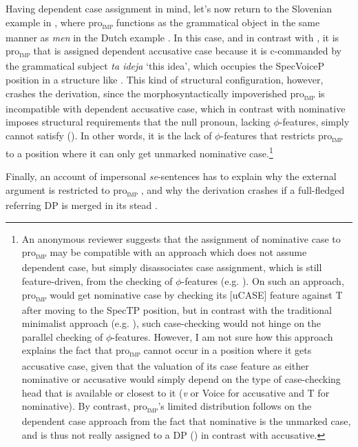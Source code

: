 \documentclass[output=paper,
modfonts,nonflat,
newtxmath
]{langsci/langscibook}
\begin{document}
 Having dependent case assignment in mind, let's now return to the Slovenian example in , where pro\textsubscript{\textsc{imp}} functions as the grammatical object in the same manner as \textit{men} in the Dutch example . In this case, and in contrast with , it is pro\textsubscript{\textsc{imp}} that is assigned dependent accusative case because it is c-commanded by the grammatical subject \textit{ta ideja} `this idea', which occupies the SpecVoiceP position in a structure like . This kind of structural configuration, however, crashes the derivation, since the morphosyntactically impoverished pro\textsubscript{\textsc{imp}} is incompatible with dependent accusative case, which in contrast with nominative imposes structural requirements that the null pronoun, lacking $\phi$-features, simply cannot satisfy (\citealt{Fenger2017}). In other words, it is the lack of $\phi$-features that restricts pro\textsubscript{\textsc{imp}} to a position where it can only get unmarked nominative case.\footnote{An anonymous reviewer suggests that the assignment of nominative case to pro\textsubscript{\textsc{imp}} may be compatible with an approach which does not assume dependent case, but simply disassociates case assignment, which is still feature-driven, from the checking of $\phi$-features (e.g. \citealt{boskovic2007}). On such an approach, pro\textsubscript{\textsc{imp}} would get nominative case by checking its [uCASE] feature against T  after moving to the SpecTP position, but in contrast with the traditional minimalist approach (e.g. \citealt{chomsky2001}), such case-checking would not hinge on the parallel checking of $\phi$-features. However, I am not sure how this approach explains the fact that pro\textsubscript{\textsc{imp}} cannot occur in a position where it gets accusative case, given that the valuation of its case feature as either nominative or accusative would simply depend on the type of case-checking head that is available or closest to it (\textit{v} or Voice for accusative and T for nominative). By contrast, pro\textsubscript{\textsc{imp}}'s limited distribution follows on the dependent case approach from the fact that nominative is the unmarked case, and is thus not really assigned to a DP (\citealt{kornfilt2015}) in contrast with accusative.}

Finally, an account of impersonal \textit{se}-sentences has to explain why the external argument is restricted to pro\textsubscript{\textsc{imp}} , and why the derivation crashes if a full-fledged referring DP is merged in its stead .
\end{document}
